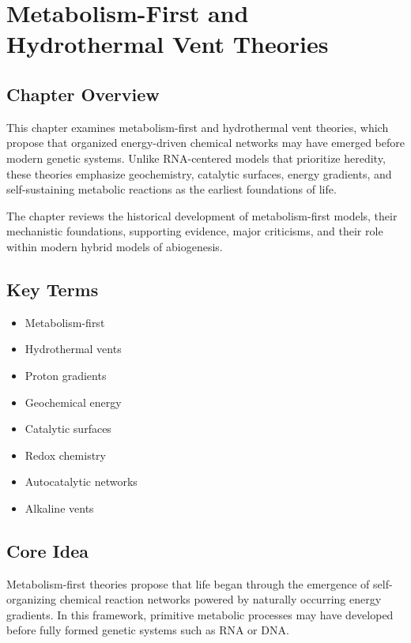 \documentclass[
  oneside]{book}
\providecommand{\tightlist}{%
  \setlength{\itemsep}{0pt}\setlength{\parskip}{0pt}}
\begin{document}
\chapter{Metabolism-First and Hydrothermal Vent Theories}\label{metabolism-first-and-hydrothermal-vent-theories}

\section{Chapter Overview}\label{chapter-overview-2}

This chapter examines metabolism-first and hydrothermal vent theories, which propose that organized energy-driven chemical networks may have emerged before modern genetic systems. Unlike RNA-centered models that prioritize heredity, these theories emphasize geochemistry, catalytic surfaces, energy gradients, and self-sustaining metabolic reactions as the earliest foundations of life.

The chapter reviews the historical development of metabolism-first models, their mechanistic foundations, supporting evidence, major criticisms, and their role within modern hybrid models of abiogenesis.

\section{Key Terms}\label{key-terms-2}

\begin{itemize}
\tightlist
\item
  Metabolism-first
\item
  Hydrothermal vents
\item
  Proton gradients
\item
  Geochemical energy
\item
  Catalytic surfaces
\item
  Redox chemistry
\item
  Autocatalytic networks
\item
  Alkaline vents
\end{itemize}

\section{Core Idea}\label{core-idea-2}

Metabolism-first theories propose that life began through the emergence of self-organizing chemical reaction networks powered by naturally occurring energy gradients. In this framework, primitive metabolic processes may have developed before fully formed genetic systems such as RNA or DNA.
\end{document}

